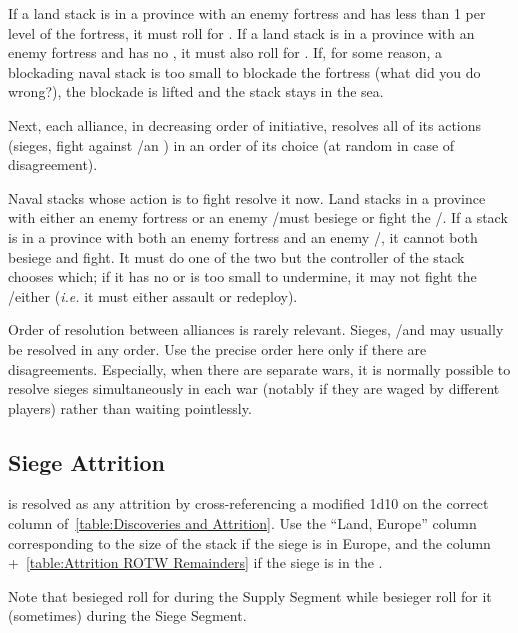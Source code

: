 If a land stack is in a province with an enemy fortress and has less than 1\LD
per level of the fortress, it must roll for . If a land
stack is in a province with an enemy fortress and has no \LoS, it must also
roll for . If, for some reason, a blockading naval
stack is too small to blockade the fortress (what did you do wrong?), the
blockade is lifted and the stack stays in the sea.

Next, each alliance, in decreasing order of initiative, resolves all of its
actions (sieges, fight against \REVOLT/\REBELLION an \corsaire) in an order of
its choice (at random in case of disagreement).

Naval stacks whose action is to fight \corsaire resolve it now. Land stacks in
a province with either an enemy fortress or an enemy \REVOLT/\REBELLION must
besiege or fight the \REVOLT/\REBELLION. If a stack is in a province with both
an enemy fortress and an enemy \REVOLT/\REBELLION, it cannot both besiege and
fight. It must do one of the two but the controller of the stack chooses
which; if it has no \LoS or is too small to undermine, it may not fight the
\REVOLT/\REBELLION either (\emph{i.e.} it must either assault or redeploy).

\begin{designnote}
  Order of resolution between alliances is rarely relevant. Sieges,
  \REVOLT/\REBELLION and \corsaire may usually be resolved in any order. Use
  the precise order here only if there are disagreements. Especially, when
  there are separate wars, it is normally possible to resolve sieges
  simultaneously in each war (notably if they are waged by different players)
  rather than waiting pointlessly.
\end{designnote}

\subsection{Siege Attrition}
 is resolved as any attrition by cross-referencing a
modified 1d10 on the correct column of~\ref{table:Discoveries and
  Attrition}. Use the ``Land, Europe'' column corresponding to the size of the
stack if the siege is in Europe, and the \ROTW column +~\ref{table:Attrition
  ROTW Remainders} if the siege is in the \ROTW.

Note that besieged roll for  during the Supply Segment
while besieger roll for it (sometimes) during the Siege Segment.

